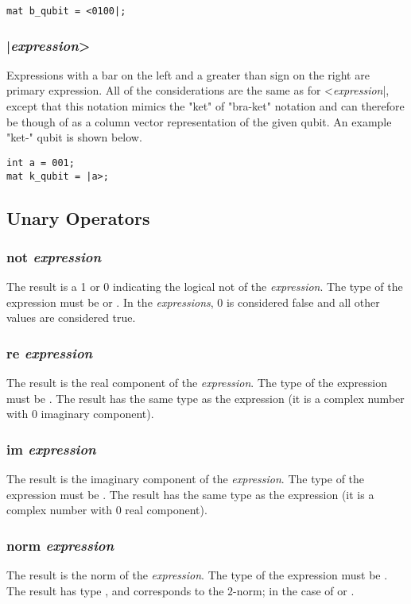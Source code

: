 \begin{lstlisting}
mat b_qubit = <0100|;
\end{lstlisting}

\subsubsection{|\textit{expression}>}
Expressions with a bar on the left and a greater than sign on the right are primary expression. All of the considerations are the same as for <\textit{expression}|, except that this notation mimics the "ket" of "bra-ket" notation and can therefore be though of as a column vector representation of the given qubit. An example "ket-" qubit is shown below.

\begin{lstlisting}
int a = 001;
mat k_qubit = |a>;
\end{lstlisting}

\subsection{Unary Operators}
\subsubsection{not \textit{expression}}
The result is a 1 or 0 indicating the logical \textsf{not} of the \textit{expression}. The type of the expression must be \integ or \float. In the \textit{expressions}, 0 is considered false and all other values are considered true.
\subsubsection{re \textit{expression}}
The result is the real component of the \textit{expression}. The type of the expression must be  \complex. The result has the same type as the expression (it is a complex number with  0 imaginary component).
\subsubsection{im \textit{expression}}
The result is the imaginary component of the \textit{expression}. The type of the expression must be  \complex. The result has the same type as the expression (it is a complex number with  0 real component).
\subsubsection{norm \textit{expression}}
The result is the norm of the \textit{expression}. The type of the expression must be \mat. The result has type \float, and corresponds to the $2$-norm; in the case of \complex or \float.
